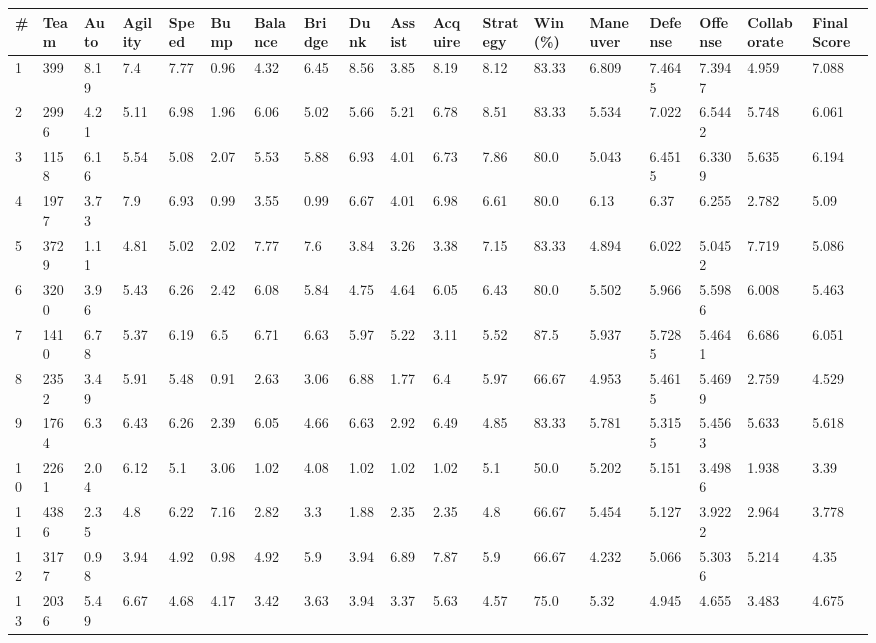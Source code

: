 \documentclass[landscape, 10pt]{report}
\begin{document}
\begin{longtable}{l || l || l | l | l | l | l | l | l | l | l | l | l || l | l | l | l | l} 
\# & Team & Auto & Agility & Speed & Bump & Balance & Bridge & Dunk & Assist & Acquire & Strategy & Win (\%) & Maneuver & Defense & Offense & Collaborate & Final Score \\ \hline \endhead 
\rowcolor{lightgray}1 & 399 & 8.19 & 7.4 & 7.77 & 0.96 & 4.32 & 6.45 & 8.56 & 3.85 & 8.19 & 8.12 & 83.33 & 6.809 & 7.4645 & 7.3947 & 4.959 & 7.088\\ 
2 & 2996 & 4.21 & 5.11 & 6.98 & 1.96 & 6.06 & 5.02 & 5.66 & 5.21 & 6.78 & 8.51 & 83.33 & 5.534 & 7.022 & 6.5442 & 5.748 & 6.061\\ 
\rowcolor{lightgray}3 & 1158 & 6.16 & 5.54 & 5.08 & 2.07 & 5.53 & 5.88 & 6.93 & 4.01 & 6.73 & 7.86 & 80.0 & 5.043 & 6.4515 & 6.3309 & 5.635 & 6.194\\ 
4 & 1977 & 3.73 & 7.9 & 6.93 & 0.99 & 3.55 & 0.99 & 6.67 & 4.01 & 6.98 & 6.61 & 80.0 & 6.13 & 6.37 & 6.255 & 2.782 & 5.09\\ 
\rowcolor{lightgray}5 & 3729 & 1.11 & 4.81 & 5.02 & 2.02 & 7.77 & 7.6 & 3.84 & 3.26 & 3.38 & 7.15 & 83.33 & 4.894 & 6.022 & 5.0452 & 7.719 & 5.086\\ 
6 & 3200 & 3.96 & 5.43 & 6.26 & 2.42 & 6.08 & 5.84 & 4.75 & 4.64 & 6.05 & 6.43 & 80.0 & 5.502 & 5.966 & 5.5986 & 6.008 & 5.463\\ 
\rowcolor{lightgray}7 & 1410 & 6.78 & 5.37 & 6.19 & 6.5 & 6.71 & 6.63 & 5.97 & 5.22 & 3.11 & 5.52 & 87.5 & 5.937 & 5.7285 & 5.4641 & 6.686 & 6.051\\ 
8 & 2352 & 3.49 & 5.91 & 5.48 & 0.91 & 2.63 & 3.06 & 6.88 & 1.77 & 6.4 & 5.97 & 66.67 & 4.953 & 5.4615 & 5.4699 & 2.759 & 4.529\\ 
\rowcolor{lightgray}9 & 1764 & 6.3 & 6.43 & 6.26 & 2.39 & 6.05 & 4.66 & 6.63 & 2.92 & 6.49 & 4.85 & 83.33 & 5.781 & 5.3155 & 5.4563 & 5.633 & 5.618\\ 
10 & 2261 & 2.04 & 6.12 & 5.1 & 3.06 & 1.02 & 4.08 & 1.02 & 1.02 & 1.02 & 5.1 & 50.0 & 5.202 & 5.151 & 3.4986 & 1.938 & 3.39\\ 
\rowcolor{lightgray}11 & 4386 & 2.35 & 4.8 & 6.22 & 7.16 & 2.82 & 3.3 & 1.88 & 2.35 & 2.35 & 4.8 & 66.67 & 5.454 & 5.127 & 3.9222 & 2.964 & 3.778\\ 
12 & 3177 & 0.98 & 3.94 & 4.92 & 0.98 & 4.92 & 5.9 & 3.94 & 6.89 & 7.87 & 5.9 & 66.67 & 4.232 & 5.066 & 5.3036 & 5.214 & 4.35\\ 
\rowcolor{lightgray}13 & 2036 & 5.49 & 6.67 & 4.68 & 4.17 & 3.42 & 3.63 & 3.94 & 3.37 & 5.63 & 4.57 & 75.0 & 5.32 & 4.945 & 4.655 & 3.483 & 4.675\\ 

\end{longtable}
\end{document}
